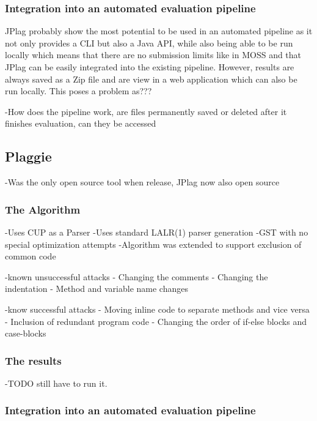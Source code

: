 \documentclass[a4paper, 11pt]{article}
\renewcommand{\\}{\vspace*{0.5\baselineskip} \newline}
\begin{document}
\subsubsection{Integration into an automated evaluation pipeline}

JPlag probably show the most potential to be used in an automated pipeline as it not only provides a CLI but also a Java API, while also being able to be
run locally\autocite{JPlagG} which means that there are no submission limits like in MOSS and that JPlag can be easily integrated into the existing pipeline.
However, results are always saved as a Zip file and are view in a web application which can also be run locally. This poses a problem as???

-How does the pipeline work, are files permanently saved or deleted after it finishes evaluation, can they be accessed

\subsection{Plaggie}

-Was the only open source tool when release\autocite{PLAGGIE}, JPlag now also open source

\subsubsection{The Algorithm}

-Uses CUP as a Parser
-Uses standard LALR(1) parser generation\autocite{CUP}
-GST with no special optimization attempts
-Algorithm was extended to support exclusion of common code\autocite[4. Algorithm used]{RMP}

-known unsuccessful attacks
- Changing the comments
- Changing the indentation
- Method and variable name changes\autocite[Known successful attacks]{RMP}

-know successful attacks
- Moving inline code to separate methods and vice versa
- Inclusion of redundant program code
- Changing the order of if-else blocks and case-blocks\autocite[Known unsuccessful attacks]{RMP}

\subsubsection{The results}

-TODO still have to run it.

\subsubsection{Integration into an automated evaluation pipeline}
\end{document}
